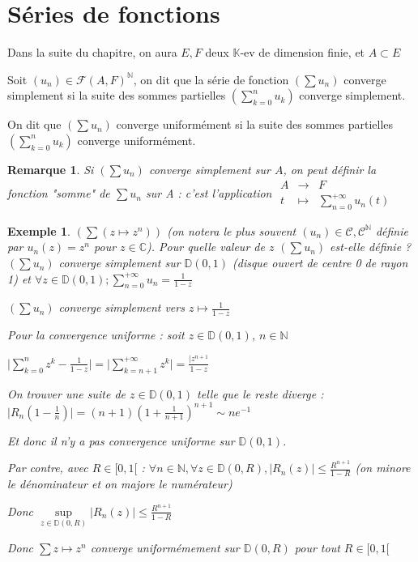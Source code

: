 \documentclass[a4paper,12pt]{book}
\newcommand{\Def}[2]{\begin{tcolorbox}[sharp corners, colback=white,colframe=blue!90!black!75, title=Définition : #1]#2\end{tcolorbox}}
\newtheorem{Exe}{Exemple}[section]
\newtheorem{Rem}{Remarque}[section]
\def\C{\mathbb{C}}
\def\N{\mathbb{N}}
\def\K{\mathbb{K}}
\begin{document}
\section{Séries de fonctions}
Dans la suite du chapitre, on aura $E,F$ deux $\K$-ev de dimension finie, et $A\subset E$
\Def{Convergences}{Soit $(u_n)\in\mathcal{F}(A,F)^\N$, on dit que la série de fonction $(\sum u_n)$ converge simplement si la suite des sommes partielles $\left(\sum\limits_{k=0}^n u_k\right)$ converge simplement.
\par On dit que $(\sum u_n)$ converge uniformément si la suite des sommes partielles $\left(\sum\limits_{k=0}^nu_k\right)$ converge uniformément.}
\begin{Rem}
Si $(\sum u_n)$ converge simplement sur $A$, on peut définir la fonction "somme" de $\sum u_n$ sur A : c'est l'application $\begin{array}{rcl} A & \to & F \\ t & \mapsto & \sum\limits_{n=0}^{+\infty}u_n(t)\end{array}$
\end{Rem}
\begin{Exe}
$(\sum( z\mapsto z^n))$ (on notera le plus souvent $(u_n)\in\mathcal{C,C}^\N$ définie par $u_n(z)=z^n$ pour $z\in\C$). Pour quelle valeur de $z$ $(\sum u_n)$ est-elle définie ? $(\sum u_n)$ converge simplement sur $\mathbb{D}(0,1)$ (disque ouvert de centre 0 de rayon 1) et $\forall z\in \mathbb{D}(0,1); \sum\limits_{n=0}^{+\infty}u_n=\frac{1}{1-z}$ \par $(\sum u_n)$ converge simplement vers $z\mapsto \frac{1}{1-z}$
\par Pour la convergence uniforme : soit $z\in\mathbb{D}(0,1)$, $n\in\N$ \par $\vert\sum\limits_{k=0}^nz^k - \frac{1}{1-z}\vert = \vert\sum\limits_{k=n+1}^{+\infty} z^k\vert =\frac{\vert z^{n+1}}{1-z}$ \par On trouver une suite de $z\in\mathbb{D}(0,1)$ telle que le reste diverge : $\vert R_n(1-\frac{1}{n})\vert = (n+1)(1+\frac{1}{n+1})^{n+1}\sim ne^{-1}$ \par Et donc il n'y a pas convergence uniforme sur $\mathbb{D}(0,1)$.
\par Par contre, avec $R\in[0,1[$ : $\forall n\in\N,\forall z\in\mathbb{D}(0,R), \vert R_n(z)\vert\leq \frac{R^{n+1}}{1-R}$ (on minore le dénominateur et on majore le numérateur) \par Donc $\sup\limits_{z\in\mathbb{D}(0,R)}\vert R_n(z)\vert\leq \frac{R^{n+1}}{1-R}$ \par Donc $\sum z\mapsto z^n$ converge uniformémement sur $\mathbb{D}(0,R)$ pour tout $R\in[0,1[$
\end{Exe}
\end{document}
